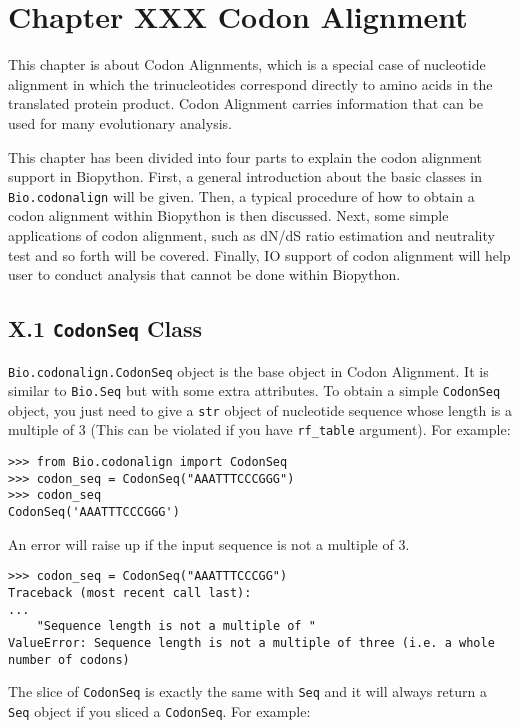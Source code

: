 \documentclass{article}
\begin{document}
\section{Chapter XXX Codon Alignment}

This chapter is about Codon Alignments, which is a special case of
nucleotide alignment in which the trinucleotides correspond directly to
amino acids in the translated protein product. Codon Alignment carries
information that can be used for many evolutionary analysis.

This chapter has been divided into four parts to explain the codon
alignment support in Biopython. First, a general introduction about the
basic classes in \texttt{Bio.codonalign} will be given. Then, a typical
procedure of how to obtain a codon alignment within Biopython is then
discussed. Next, some simple applications of codon alignment, such as
dN/dS ratio estimation and neutrality test and so forth will be covered.
Finally, IO support of codon alignment will help user to conduct
analysis that cannot be done within Biopython.

\subsection{X.1 \texttt{CodonSeq} Class}

\texttt{Bio.codonalign.CodonSeq} object is the base object in Codon
Alignment. It is similar to \texttt{Bio.Seq} but with some extra
attributes. To obtain a simple \texttt{CodonSeq} object, you just need
to give a \texttt{str} object of nucleotide sequence whose length is a
multiple of 3 (This can be violated if you have \texttt{rf\_table}
argument). For example:

\begin{verbatim}
>>> from Bio.codonalign import CodonSeq
>>> codon_seq = CodonSeq("AAATTTCCCGGG")
>>> codon_seq
CodonSeq('AAATTTCCCGGG')
\end{verbatim}

An error will raise up if the input sequence is not a multiple of 3.

\begin{verbatim}
>>> codon_seq = CodonSeq("AAATTTCCCGG")
Traceback (most recent call last):
...
    "Sequence length is not a multiple of "
ValueError: Sequence length is not a multiple of three (i.e. a whole number of codons)
\end{verbatim}


The slice of \texttt{CodonSeq} is exactly the same with \texttt{Seq} and
it will always return a \texttt{Seq} object if you sliced a
\texttt{CodonSeq}. For example:
\end{document}
